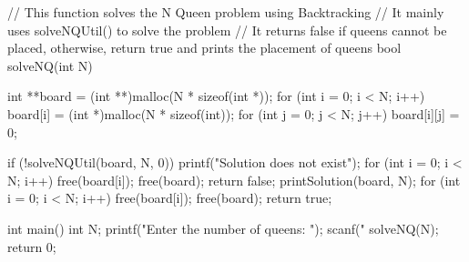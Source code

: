 // This function solves the N Queen problem using Backtracking 
// It mainly uses solveNQUtil() to solve the problem 
// It returns false if queens cannot be placed, otherwise, return true and prints the placement of queens 
bool solveNQ(int N) 
{ 
    int **board = (int **)malloc(N * sizeof(int *)); 
    for (int i = 0; i < N; i++) 
    { 
        board[i] = (int *)malloc(N * sizeof(int)); 
        for (int j = 0; j < N; j++) 
        { 
            board[i][j] = 0; 
        } 
    } 
 
    if (!solveNQUtil(board, N, 0)) 
    { 
        printf("Solution does not exist\n"); 
        for (int i = 0; i < N; i++) 
        { 
            free(board[i]); 
        } 
        free(board); 
return false; 
} 
printSolution(board, N); 
for (int i = 0; i < N; i++) 
{ 
free(board[i]); 
} 
free(board); 
return true; 
} 
int main() 
{ 
int N; 
printf("Enter the number of queens: "); 
scanf("%
solveNQ(N); 
return 0; 
}
